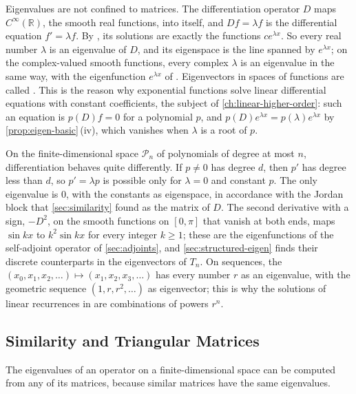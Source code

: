 Eigenvalues are not confined to matrices. The differentiation operator $D$ maps $C^\infty(\mathbb R)$, the smooth real functions, into itself, and $Df=\lambda f$ is the differential equation $f'=\lambda f$. By , its solutions are exactly the functions $ce^{\lambda x}$. So every real number $\lambda$ is an eigenvalue of $D$, and its eigenspace is the line spanned by $e^{\lambda x}$; on the complex-valued smooth functions, every complex $\lambda$ is an eigenvalue in the same way, with the eigenfunction $e^{\lambda x}$ of . Eigenvectors in spaces of functions are called . This is the reason why exponential functions solve linear differential equations with constant coefficients, the subject of \cref{ch:linear-higher-order}: such an equation is $p(D)f=0$ for a polynomial $p$, and $p(D)e^{\lambda x}=p(\lambda)e^{\lambda x}$ by \cref{prop:eigen-basic}\,(iv), which vanishes when $\lambda$ is a root of $p$.

On the finite-dimensional space $\mathcal P_n$ of polynomials of degree at most $n$, differentiation behaves quite differently. If $p\ne0$ has degree $d$, then $p'$ has degree less than $d$, so $p'=\lambda p$ is possible only for $\lambda=0$ and constant $p$. The only eigenvalue is $0$, with the constants as eigenspace, in accordance with the Jordan block that \cref{sec:similarity} found as the matrix of $D$. The second derivative with a sign, $-D^2$, on the smooth functions on $[0,\pi]$ that vanish at both ends, maps $\sin kx$ to $k^2\sin kx$ for every integer $k\ge1$; these are the eigenfunctions of the self-adjoint operator of \cref{sec:adjoints}, and \cref{sec:structured-eigen} finds their discrete counterparts in the eigenvectors of $T_n$. On sequences, the  $(x_0,x_1,x_2,\ldots)\mapsto(x_1,x_2,x_3,\ldots)$ has every number $r$ as an eigenvalue, with the geometric sequence $(1,r,r^2,\ldots)$ as eigenvector; this is why the solutions of linear recurrences in  are combinations of powers $r^n$.

\subsection{Similarity and Triangular Matrices}

The eigenvalues of an operator on a finite-dimensional space can be computed from any of its matrices, because similar matrices have the same eigenvalues.

